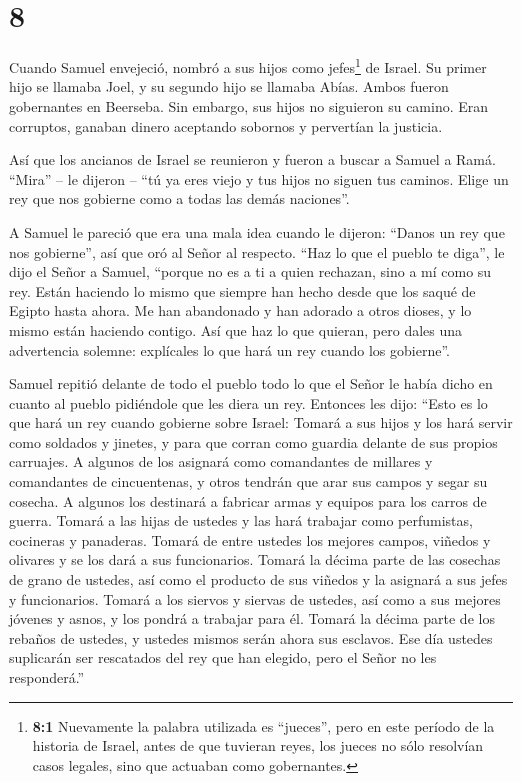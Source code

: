 \hypertarget{section-7}{%
\section{8}\label{section-7}}

 Cuando Samuel envejeció, nombró a sus hijos como
jefes\footnote{\textbf{8:1} Nuevamente la palabra utilizada es
  ``jueces'', pero en este período de la historia de Israel, antes de
  que tuvieran reyes, los jueces no sólo resolvían casos legales, sino
  que actuaban como gobernantes.} de Israel.  Su primer hijo
se llamaba Joel, y su segundo hijo se llamaba Abías. Ambos fueron
gobernantes en Beerseba.  Sin embargo, sus hijos no
siguieron su camino. Eran corruptos, ganaban dinero aceptando sobornos y
pervertían la justicia.

 Así que los ancianos de Israel se reunieron y fueron a
buscar a Samuel a Ramá.  ``Mira'' -- le dijeron -- ``tú ya
eres viejo y tus hijos no siguen tus caminos. Elige un rey que nos
gobierne como a todas las demás naciones''.

 A Samuel le pareció que era una mala idea cuando le
dijeron: ``Danos un rey que nos gobierne'', así que oró al Señor al
respecto.  ``Haz lo que el pueblo te diga'', le dijo el
Señor a Samuel, ``porque no es a ti a quien rechazan, sino a mí como su
rey.  Están haciendo lo mismo que siempre han hecho desde
que los saqué de Egipto hasta ahora. Me han abandonado y han adorado a
otros dioses, y lo mismo están haciendo contigo.  Así que
haz lo que quieran, pero dales una advertencia solemne: explícales lo
que hará un rey cuando los gobierne''.

 Samuel repitió delante de todo el pueblo todo lo que el
Señor le había dicho en cuanto al pueblo pidiéndole que les diera un
rey.  Entonces les dijo: ``Esto es lo que hará un rey
cuando gobierne sobre Israel: Tomará a sus hijos y los hará servir como
soldados y jinetes, y para que corran como guardia delante de sus
propios carruajes.  A algunos de los asignará como
comandantes de millares y comandantes de cincuentenas, y otros tendrán
que arar sus campos y segar su cosecha. A algunos los destinará a
fabricar armas y equipos para los carros de guerra.  Tomará
a las hijas de ustedes y las hará trabajar como perfumistas, cocineras y
panaderas.  Tomará de entre ustedes los mejores campos,
viñedos y olivares y se los dará a sus funcionarios. 
Tomará la décima parte de las cosechas de grano de ustedes, así como el
producto de sus viñedos y la asignará a sus jefes y funcionarios.
 Tomará a los siervos y siervas de ustedes, así como a sus
mejores jóvenes y asnos, y los pondrá a trabajar para él. 
Tomará la décima parte de los rebaños de ustedes, y ustedes mismos serán
ahora sus esclavos.  Ese día ustedes suplicarán ser
rescatados del rey que han elegido, pero el Señor no les responderá.''

